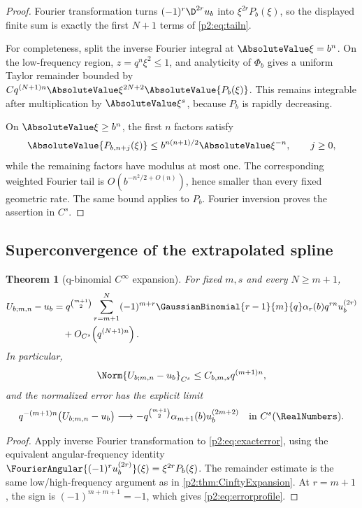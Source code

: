 \documentclass[11pt,oneside]{article}
\numberwithin{equation}{section}
\newtheorem{theorem}{Theorem}[section]
\theoremstyle{definition}
\theoremstyle{remark}
\begin{document}
\begin{proof}
Fourier transformation turns \((-1)^r\D^{2r}u_b\) into
\(\xi^{2r}P_b(\xi)\), so the displayed finite sum is exactly the first
\(N+1\) terms of \eqref{p2:eq:tailn}.

For completeness, split the inverse Fourier integral at \(\AbsoluteValue\xi=b^n\). On the
low-frequency region, \(z=q^n\xi^2\leq1\), and analyticity of \(\Phi_b\) gives a
uniform Taylor remainder bounded by
\(Cq^{(N+1)n}\AbsoluteValue\xi^{2N+2}\AbsoluteValue{P_b(\xi)}\). This remains integrable after
multiplication by \(\AbsoluteValue\xi^s\), because \(P_b\) is rapidly decreasing.

On \(\AbsoluteValue\xi\geq b^n\), the first \(n\) factors satisfy
\[
 \AbsoluteValue{P_{b,n+j}(\xi)}\leq
 b^{n(n+1)/2}\AbsoluteValue\xi^{-n},\qquad j\geq0,
\]
while the remaining factors have modulus at most one. The corresponding weighted
Fourier tail is \(O(b^{-n^2/2+O(n)})\), hence smaller than every fixed geometric
rate. The same bound applies to \(P_b\). Fourier inversion proves the assertion
in \(C^s\).
\end{proof}

\subsection{Superconvergence of the extrapolated spline}

\begin{theorem}[q-binomial \(C^\infty\) expansion]
\label{p2:thm:Uexpansion}
For fixed \(m,s\) and every \(N\geq m+1\),
\begin{align}
 U_{b;m,n}-u_b
 &=q^{\binom{m+1}{2}}
 \sum_{r=m+1}^{N}(-1)^{m+r}
 \GaussianBinomial{r-1}{m}{q}\alpha_r(b)q^{rn}u_b^{(2r)}
 \notag\\
 &\quad+O_{C^s}\!\left(q^{(N+1)n}\right).
 \label{p2:eq:Uallorder}
\end{align}
In particular,
\begin{equation}
 \Norm{U_{b;m,n}-u_b}_{C^s}
 \leq C_{b,m,s}q^{(m+1)n},
 \label{p2:eq:Csuper}
\end{equation}
and the normalized error has the explicit limit
\begin{equation}
 q^{-(m+1)n}\bigl(U_{b;m,n}-u_b\bigr)
 \longrightarrow
 -q^{\binom{m+1}{2}}\alpha_{m+1}(b)u_b^{(2m+2)}
 \quad\text{in }C^s(\RealNumbers).
 \label{p2:eq:errorprofile}
\end{equation}
\end{theorem}

\begin{proof}
Apply inverse Fourier transformation to \eqref{p2:eq:exacterror}, using the
equivalent angular-frequency identity
\(\FourierAngular{(-1)^ru_b^{(2r)}}(\xi)=\xi^{2r}P_b(\xi)\). The remainder estimate is
the same low/high-frequency argument as in \cref{p2:thm:CinftyExpansion}. At
\(r=m+1\), the sign is \((-1)^{m+m+1}=-1\), which gives
\eqref{p2:eq:errorprofile}.
\end{proof}
\end{document}
